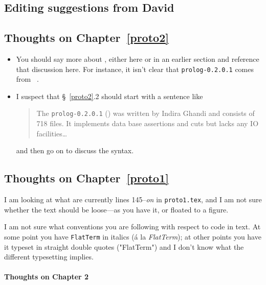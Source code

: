 \begin{scope}
\section{Editing suggestions from David}\label{sec:edit-sugg-david}

\subsection{Thoughts on Chapter~\ref{proto2}}\label{subsec:thoughts-chapt-proto2}

\begin{itemize}
\item
  You should say more about \cite{prolog-lib}, either here or in an
  earlier section and reference that discussion here.  For instance, it
  isn't clear that \Verb!prolog-0.2.0.1! comes from~ \cite{prolog-lib}.
\item
  I suspect that \S~\ref{proto2}.2 should start with a sentence like 
  \begin{quote}\color[rgb]{0.3,0,0.6}\small\singlespacing
    The \Verb!prolog-0.2.0.1! (\cite{prolog-lib}) was written by Indira
    Ghandi and consists of 718  files.
    It implements data base assertions and cuts but lacks any IO
    facilities\dots
  \end{quote}
  and then go on to discuss the syntax.
\end{itemize}

\subsection{Thoughts on Chapter~\ref{proto1}}\label{subsec:thoughts-chapt-proto1}

I am looking at what are currently lines 145--\textit{on} in
\Verb!proto1.tex!, and I am not sure whether 
the text should be loose---as you have it, or floated to a figure.

I am not sure what conventions you are following with respect to code in
text.
At some point you have \Verb!FlatTerm! in italics (\'a la
\textit{FlatTerm}); at other points you have it typeset in straight
double quotes ("FlatTerm") and I don't know what the different
typesetting implies.


\paragraph{Thoughts on Chapter 2}


\end{scope}
